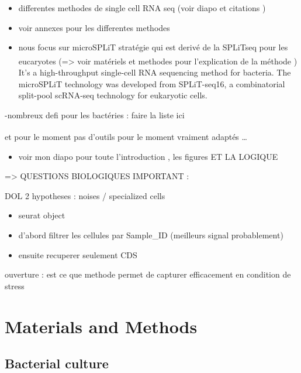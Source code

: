 \documentclass[
  11pt,
  a4paper,
]{report}
\providecommand{\tightlist}{%
  \setlength{\itemsep}{0pt}\setlength{\parskip}{0pt}}\usepackage{longtable,booktabs,array}
\begin{document}
\begin{itemize}
\tightlist
\item
  differentes methodes de single cell RNA seq (voir diapo et citations )
\item
  voir annexes pour les differentes methodes
\item
  nous focus sur microSPLiT stratégie qui est derivé de la SPLiTseq pour
  les eucaryotes (=\textgreater{} voir matériels et methodes pour
  l'explication de la méthode
  )\textsuperscript{} It's a
  high-throughput single-cell RNA sequencing method for bacteria. The
  microSPLiT technology was developed from SPLiT-seq16, a combinatorial
  split-pool scRNA-seq technology for eukaryotic cells.
\end{itemize}

-nombreux defi pour les bactéries : faire la liste ici

et pour le moment pas d'outils pour le moment vraiment adaptés
\ldots{}\textsuperscript{}

\begin{itemize}
\tightlist
\item
  voir mon diapo pour toute l'introduction , les figures ET LA LOGIQUE
\end{itemize}

=\textgreater{} QUESTIONS BIOLOGIQUES IMPORTANT :

DOL 2 hypotheses : noises / specialized cells

\begin{itemize}
\item
  seurat object
\item
  d'abord filtrer les cellules par Sample\_ID (meilleurs signal
  probablement)
\item
  ensuite recuperer seulement CDS
\end{itemize}

ouverture : est ce que methode permet de capturer efficacement en
condition de stress


\chapter{Materials and Methods}\label{sec-materials-and-methods}

\section{Bacterial culture}\label{bacterial-culture}
\end{document}
